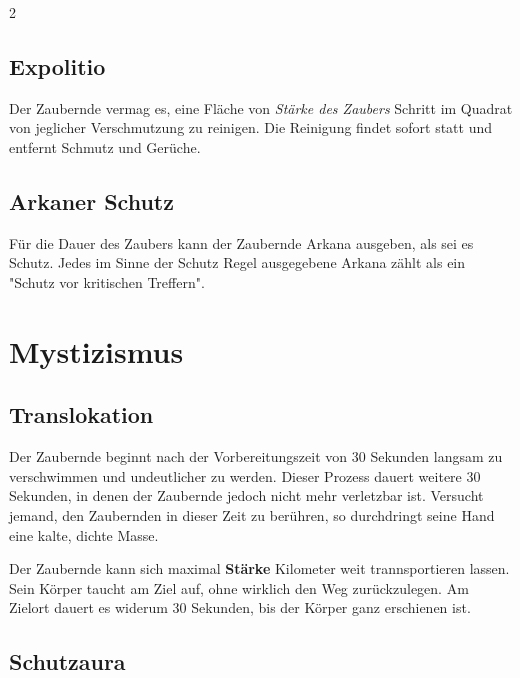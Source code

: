 \begin{multicols*}{2}


\subsection{Expolitio}

Der Zaubernde vermag es, eine Fläche von \textit{Stärke des Zaubers} Schritt im Quadrat von jeglicher Verschmutzung zu reinigen. Die Reinigung findet sofort statt und entfernt Schmutz und Gerüche.



\subsection{Arkaner Schutz}

Für die Dauer des Zaubers kann der Zaubernde Arkana ausgeben, als sei es Schutz. Jedes im Sinne der Schutz Regel ausgegebene Arkana zählt als ein "Schutz vor kritischen Treffern".



\section{Mystizismus}

\subsection{Translokation}

Der Zaubernde beginnt nach der Vorbereitungszeit von 30 Sekunden langsam zu verschwimmen und undeutlicher zu werden. Dieser Prozess dauert weitere 30 Sekunden, in denen der Zaubernde jedoch nicht mehr verletzbar ist. Versucht jemand, den Zaubernden in dieser Zeit zu berühren, so durchdringt seine Hand eine kalte, dichte Masse.

Der Zaubernde kann sich maximal \textbf{Stärke} Kilometer weit trannsportieren lassen. Sein Körper taucht am Ziel auf, ohne wirklich den Weg zurückzulegen. Am Zielort dauert es widerum 30 Sekunden, bis der Körper ganz erschienen ist.



\subsection{Schutzaura}


\end{multicols*}
